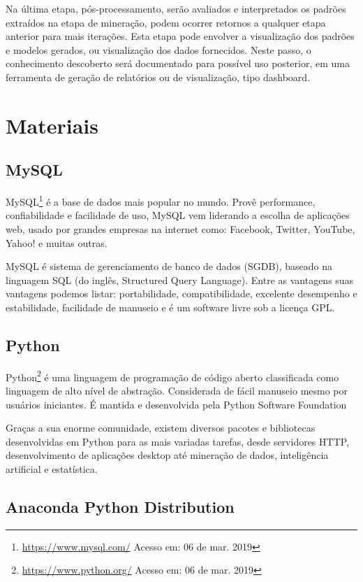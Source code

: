 Na última etapa, pós-processamento, serão avaliados e interpretados os padrões
extraídos na etapa de mineração, podem ocorrer retornos a qualquer etapa
anterior para mais iterações. Esta etapa pode envolver a visualização dos
padrões e modelos gerados, ou visualização dos dados fornecidos. Neste passo, o
conhecimento descoberto será documentado para possível uso posterior, em uma
ferramenta de geração de relatórios ou de visualização, tipo dashboard.

\section{Materiais}

\subsection{MySQL}

MySQL\footnote{\url{https://www.mysql.com/} Acesso em: 06 de mar. 2019} é a base
de dados mais popular no mundo. Provê performance, confiabilidade e facilidade
de uso, MySQL vem liderando a escolha de aplicações web, usado por grandes
empresas na internet como: Facebook, Twitter, YouTube, Yahoo! e muitas outras.

MySQL é sistema de gerenciamento de banco de dados (SGDB), baseado na linguagem
SQL (do inglês, Structured Query Language). Entre as vantagens suas vantagens
podemos listar: portabilidade, compatibilidade, excelente desempenho e
estabilidade, facilidade de manuseio e é um software livre sob a licença GPL.

\subsection{Python}

Python\footnote{\url{https://www.python.org/} Acesso em: 06 de mar. 2019} é uma
linguagem de programação de código aberto classificada como linguagem de alto
nível de abstração. Considerada de fácil manuseio mesmo por usuários iniciantes.
É mantida e desenvolvida pela Python Software Foundation

Graças a sua enorme comunidade, existem diversos pacotes e bibliotecas
desenvolvidas em Python para as mais variadas tarefas, desde servidores HTTP,
desenvolvimento de aplicações desktop até mineração de dados, inteligência
artificial e estatística.

\subsection{Anaconda Python Distribution}

